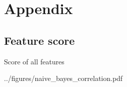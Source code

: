 
\section{Appendix}

\subsection{Feature score}%
\label{sub:full-table-feature}

\begin{table}[H]
    \centering
    \caption{Score of all features}%
    \label{tab:features-all}
    
\end{table}




 {../figures/naive_bayes_correlation.pdf}
